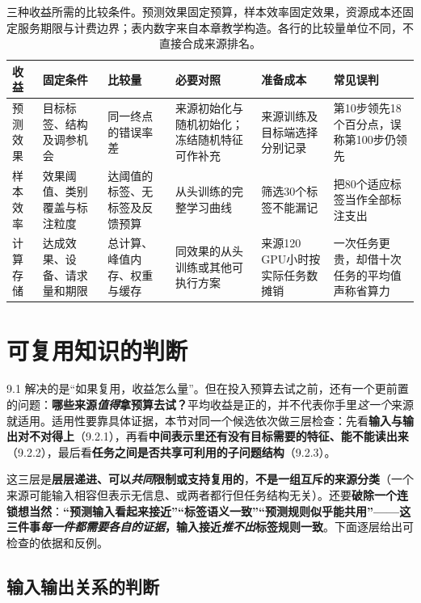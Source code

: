 \begin{table}[htbp]
  \centering
  \small
  \begin{tabularx}{\linewidth}{lXXXXX}
    \toprule
    收益 & 固定条件 & 比较量 & 必要对照 & 准备成本 & 常见误判 \\
    \midrule
    预测效果 & 目标标签、结构及调参机会 & 同一终点的错误率差 & 来源初始化与随机初始化；冻结随机特征可作补充 & 来源训练及目标端选择分别记录 & 第10步领先18个百分点，误称第100步仍领先 \\
    样本效率 & 效果阈值、类别覆盖与标注粒度 & 达阈值的标签、无标签及反馈预算 & 从头训练的完整学习曲线 & 筛选30个标签不能漏记 & 把80个适应标签当作全部标注支出 \\
    计算存储 & 达成效果、设备、请求量和期限 & 总计算、峰值内存、权重与缓存 & 同效果的从头训练或其他可执行方案 & 来源120 GPU小时按实际任务数摊销 & 一次任务更贵，却借十次任务的平均值声称省算力 \\
    \bottomrule
  \end{tabularx}
  \caption{三种收益所需的比较条件。预测效果固定预算，样本效率固定效果，资源成本还固定服务期限与计费边界；表内数字来自本章教学构造。各行的比较量单位不同，不直接合成来源排名。}
  \label{tab:ket-reuse-benefit-protocol}
\end{table}

\section{可复用知识的判断}
\label{sec:ket-reuse-compatibility}

9.1 解决的是“如果复用，收益怎么量”。但在投入预算去试之前，还有一个更前置的问题：\textbf{哪些来源\emph{值得}拿预算去试？}平均收益是正的，并不代表你手里\emph{这一个}来源就适用。适用性要靠具体证据，本节对同一个候选依次做三层检查：先看\textbf{输入与输出对不对得上}（9.2.1），再看\textbf{中间表示里还有没有目标需要的特征、能不能读出来}（9.2.2），最后看\textbf{任务之间是否共享可利用的子问题结构}（9.2.3）。

这三层是\textbf{层层递进、可以\emph{共同}限制或支持复用的}，\textbf{不是一组互斥的来源分类}（一个来源可能输入相容但表示无信息、或两者都行但任务结构无关）。还要\textbf{破除一个连锁想当然}：\textbf{“预测输入看起来接近”“标签语义一致”“预测规则似乎能共用”——这三件事\emph{每一件都需要\emph{各自}的证据}，输入接近\emph{推不出}标签规则一致}。下面逐层给出可检查的依据和反例。

\subsection{输入输出关系的判断}
\label{sec:ket-reuse-input-output}

